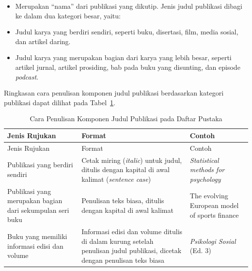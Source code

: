 \documentclass[
  indonesian,
  letterpaper,
]{scrbook}
\providecommand{\tightlist}{%
  \setlength{\itemsep}{0pt}\setlength{\parskip}{0pt}}
\begin{document}
\begin{enumerate}
  \begin{itemize}
  \tightlist
  \item
    Merupakan ``nama'' dari publikasi yang dikutip. Jenis judul
    publikasi dibagi ke dalam dua kategori besar, yaitu:
  \item
    Judul karya yang berdiri sendiri, seperti buku, disertasi, film,
    media sosial, dan artikel daring.
  \item
    Judul karya yang merupakan bagian dari karya yang lebih besar,
    seperti artikel jurnal, artikel prosiding, bab pada buku yang
    disunting, dan episode \emph{podcast}.
  \end{itemize}

  Ringkasan cara penulisan komponen judul publikasi berdasarkan kategori
  publikasi dapat dilihat pada Tabel~\ref{tbl-formatjuduldafpus}.

  \begin{longtable}[]{@{}
    >{\raggedright\arraybackslash}p{}
    >{\raggedright\arraybackslash}p{}
    >{\raggedright\arraybackslash}p{}@{}}
  \caption{Cara Penulisan Komponen Judul Publikasi pada Daftar
  Pustaka}\label{tbl-formatjuduldafpus}\tabularnewline
  \toprule\noalign{}
  \begin{minipage}[b]{\linewidth}\raggedright
  Jenis Rujukan
  \end{minipage} & \begin{minipage}[b]{\linewidth}\raggedright
  Format
  \end{minipage} & \begin{minipage}[b]{\linewidth}\raggedright
  Contoh
  \end{minipage} \\
  \midrule\noalign{}
  \endfirsthead
  \toprule\noalign{}
  \begin{minipage}[b]{\linewidth}\raggedright
  Jenis Rujukan
  \end{minipage} & \begin{minipage}[b]{\linewidth}\raggedright
  Format
  \end{minipage} & \begin{minipage}[b]{\linewidth}\raggedright
  Contoh
  \end{minipage} \\
  \midrule\noalign{}
  \endhead
  \bottomrule\noalign{}
  \endlastfoot
  Publikasi yang berdiri sendiri & Cetak miring (\emph{italic}) untuk
  judul, ditulis dengan kapital di awal kalimat (\emph{sentence case}) &
  \emph{Statistical methods for psychology} \\
  Publikasi yang merupakan bagian dari sekumpulan seri buku & Penulisan
  teks biasa, ditulis dengan kapital di awal kalimat & The evolving
  European model of sports finance \\
  Buku yang memiliki informasi edisi dan volume & Informasi edisi dan
  volume ditulis di dalam kurung setelah penulisan judul publikasi,
  dicetak dengan penulisan teks biasa & \emph{Psikologi Sosial} (Ed. 3)


\end{longtable}
\end{enumerate}
\end{document}
